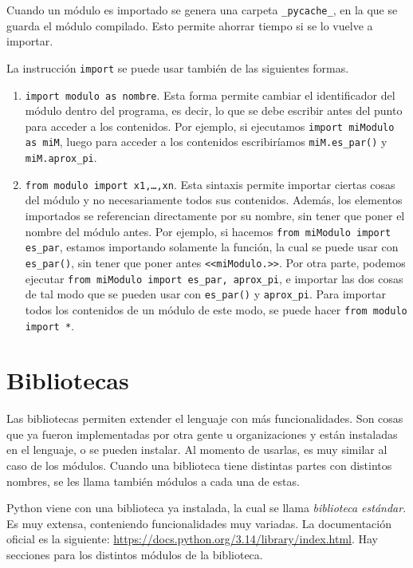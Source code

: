 \documentclass[a4paper, 12pt]{report}
\theoremstyle{definition}
\begin{document}
Cuando un módulo es importado se genera una carpeta {\tt \_pycache\_}, en la que se guarda el módulo compilado. Esto permite ahorrar tiempo si se lo vuelve a importar.

La instrucción {\tt import} se puede usar también de las siguientes formas.
\begin{enumerate}
	\item {\tt import modulo as nombre}. Esta forma permite cambiar el identificador del módulo dentro del programa, es decir, lo que se debe escribir antes del punto para acceder a los contenidos. Por ejemplo, si ejecutamos {\tt import miModulo as miM}, luego para acceder a los contenidos escribiríamos {\tt miM.es\_par()} y {\tt miM.aprox\_pi}.
	\item {\tt from modulo import x1,\dots,xn}. Esta sintaxis permite importar ciertas cosas del módulo y no necesariamente todos sus contenidos. Además, los elementos importados se referencian directamente por su nombre, sin tener que poner el nombre del módulo antes. Por ejemplo, si hacemos {\tt from miModulo import es\_par}, estamos importando solamente la función, la cual se puede usar con {\tt es\_par()}, sin tener que poner antes {\tt <<miModulo.>>}. Por otra parte, podemos ejecutar {\tt from miModulo import es\_par, aprox\_pi}, e importar las dos cosas de tal modo que se pueden usar con {\tt es\_par()} y {\tt aprox\_pi}. Para importar todos los contenidos de un módulo de este modo, se puede hacer {\tt from modulo import *}.
\end{enumerate}


\section{Bibliotecas}


Las bibliotecas permiten extender el lenguaje con más funcionalidades. Son cosas que ya fueron implementadas por otra gente u organizaciones y están instaladas en el lenguaje, o se pueden instalar. Al momento de usarlas, es muy similar al caso de los módulos. Cuando una biblioteca tiene distintas partes con distintos nombres, se les llama también módulos a cada una de estas.

Python viene con una biblioteca ya instalada, la cual se llama {\sl biblioteca estándar}. Es muy extensa, conteniendo funcionalidades muy variadas. La documentación oficial es la siguiente: \href{https://docs.python.org/3.14/library/index.html}{https://docs.python.org/3.14/library/index.html}. Hay secciones para los distintos módulos de la biblioteca.
\end{document}
